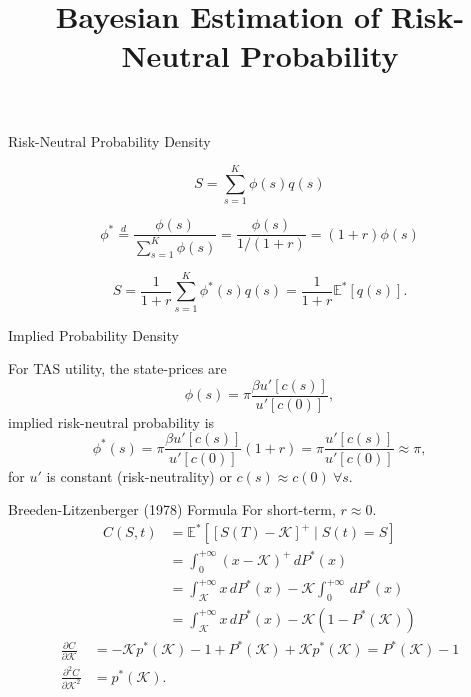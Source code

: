 \documentclass[10pt,aspectratio=43]{beamer}
\title{Bayesian Estimation of Risk-Neutral Probability}
\begin{document}
\begin{frame}[fragile]
    \titlepage
\end{frame}




\begin{frame}{ Risk-Neutral Probability Density}

    \[S=\sum_{s=1}^K\phi(s)q(s)\]

    \[\phi^*\overset{d}{=}\frac{\phi(s)}{\sum_{s=1}^K\phi(s)}=\frac{\phi(s)}{1/(1+r)}=(1+r)\phi(s)\]

    \[S=\frac{1}{1+r}\sum_{s=1}^K\phi^*(s)q(s)=\frac{1}{1+r}\mathbb{E}^*[q(s)].\]

\end{frame}
\begin{frame}{Implied  Probability Density}
 
    For TAS utility, the state-prices are 
    \[\phi(s)=\pi\frac{\beta u'[c(s)]}{u'[c(0)]},\]
    \then implied risk-neutral probability is
    \[\phi^*(s)=\pi\frac{\beta u'[c(s)]}{u'[c(0)]}(1+r)= \pi\frac{u'[c(s)]}{u'[c(0)]}\approx \pi,\]
    for $u'$ is constant (risk-neutrality) or $c(s)\approx c(0)~\forall s$.


\end{frame}

\begin{frame}{Breeden-Litzenberger (1978) Formula}
\nocite{breedenPricesStateContingentClaims1978}
For short-term, $r\approx 0$.
    \begin{align*}
        C(S,t)&=\mathbb{E}^*\left[[S(T)-\mathcal{K}]^+\mid S(t)=S\right]\\ 
        &=\int_0^{+\infty}(x-\mathcal{K})^+\,dP^*(x)\\ &=\int_{\mathcal{K}}^{+\infty}x\,dP^*(x)-\mathcal{K}\int_0^{+\infty}\,dP^*(x)\\ 
        &=\int_{\mathcal{K}}^{+\infty}x\,dP^*(x)-\mathcal{K}(1-P^*(\mathcal{K}))
    \end{align*}
    \begin{align*}
        \frac{\partial C}{\partial \mathcal{K}}&=-\mathcal{K}p^*(\mathcal{K})-1+P^*(\mathcal{K})+\mathcal{K}p^*(\mathcal{K})=P^*(\mathcal{K})-1\\ 
        \frac{\partial^2 C}{\partial \mathcal{K}^2}&=p^*(\mathcal{K}).
    \end{align*}
 \cite{ait-sahaliaNonparametricOptionPricing2003}

\end{frame}
\end{document}
